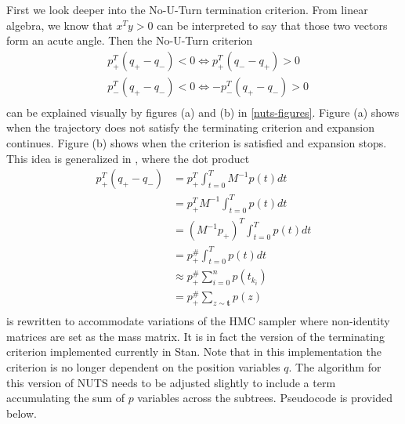 \documentclass[12pt]{report}
\begin{document}
First we look deeper into the No-U-Turn termination criterion. From linear algebra, we know that $x^Ty > 0 $ can be interpreted to say that those two vectors form an acute angle. Then the No-U-Turn criterion 
\begin{align*}
&p_{+}^T (q_+ -q_-) < 0 \Leftrightarrow p_+^T (q_- - q_+) > 0 \\
&p_{-}^T (q_+ -q_-) < 0 \Leftrightarrow -p_-^T (q_+ - q_-) > 0 \\
\end{align*}
can be explained visually by figures (a) and (b) in \ref{nuts-figures}. Figure (a) shows when the trajectory does not satisfy the terminating criterion and expansion continues. Figure (b) shows when the criterion is satisfied and expansion stops. This idea is generalized in \cite{betancourt2013generalizing}, where the dot product 
\begin{align*}
 p_{+}^T (q_{+} -q_{-})  
 &=p_{+}^T \int_{t=0}^{T} M^{-1}p(t) dt   \\
 &=p_{+}^T M^{-1} \int_{t=0}^{T} p(t)dt \\
 &=(M^{-1} p_{+})^T  \int_{t=0}^{T} p(t)dt \\
 &= p^{\#}_{+}  \int_{t=0}^{T} p(t)dt \\
 &\approx p^{\#}_{+} \sum_{i=0}^n p(t_{k_i}) \\
 &=  p^{\#}_{+} \sum_{z \sim \mathbf{t}} p(z) \\
\end{align*} 
is rewritten to accommodate variations of the HMC sampler where non-identity matrices are set as the mass matrix. It is in fact the version of the terminating criterion implemented currently in Stan. Note that in this implementation the criterion is no longer dependent on the position variables $q$. The algorithm for this version of NUTS needs to be adjusted slightly to include a term accumulating the sum of $p$ variables across the subtrees. Pseudocode is provided below.
\end{document}
